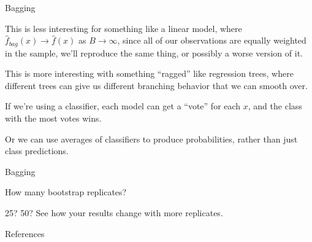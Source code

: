 \documentclass[xcolor={table}, handout]{beamer}
\newcommand{\plscbibpath}{../assets/PLSC40601}
\renewcommand{\plscbibpath}{assets/PLSC40601}%
\begin{document}



\begin{frame}{Bagging}

\begin{wideitemize}
\item This is less interesting for something like a linear model, where $\hat f_{bag}(x) \to \hat f(x)$ as $B \to \infty$, since all of our observations are equally weighted in the sample, we'll reproduce the same thing\pause, or possibly a worse version of it. \pause
\item This is more interesting with something ``ragged'' like regression trees, where different trees can give us different branching behavior that we can smooth over. \pause 
\item If we're using a classifier, each model can get a ``vote'' for each $x$, and the class with the most votes wins. \pause
\item Or we can use averages of classifiers to produce probabilities, rather than just class predictions. 
\end{wideitemize}

\end{frame}



\begin{frame}{Bagging}

\begin{wideitemize}
\item How many bootstrap replicates? \pause
\item 25? 50? \pause See how your results change with more replicates. 
\end{wideitemize}

\end{frame}



\backupbegin

\begin{frame}[allowframebreaks]{References}
    
    
\end{frame}
\backupend
\end{document}
